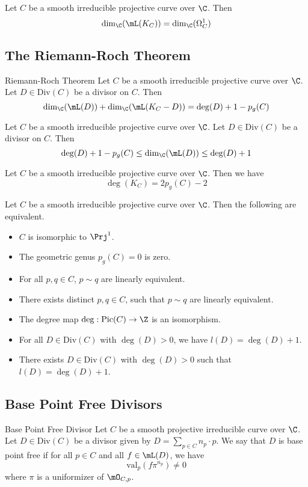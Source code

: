 \documentclass[a4paper]{article}
\begin{document}
\begin{lmm}{}{} Let $C$ be a smooth irreducible projective curve over $\C$. Then $$\dim_\C(\mL(K_C))=\dim_\C(\Omega_C^1)$$
\end{lmm}

\subsection{The Riemann-Roch Theorem}
\begin{thm}{Riemann-Roch Theorem}{} Let $C$ be a smooth irreducible projective curve over $\C$. Let $D\in\text{Div}(C)$ be a divisor on $C$. Then $$\dim_\C(\mL(D))+\dim_\C(\mL(K_C-D))=\deg(D)+1-p_g(C)$$
\end{thm}

\begin{prp}{}{} Let $C$ be a smooth irreducible projective curve over $\C$. Let $D\in\text{Div}(C)$ be a divisor on $C$. Then $$\deg(D)+1-p_g(C)\leq\dim_\C(\mL(D))\leq\deg(D)+1$$
\end{prp}

\begin{prp}{}{} Let $C$ be a smooth irreducible projective curve over $\C$. Then we have $$\deg(K_C)=2p_g(C)-2$$
\end{prp}

\begin{prp}{}{} Let $C$ be a smooth irreducible projective curve over $\C$. Then the following are equivalent. 
\begin{itemize}
\item $C$ is isomorphic to $\Prj^1$. 
\item The geometric genus $p_g(C)=0$ is zero. 
\item For all $p,q\in C$, $p\sim q$ are linearly equivalent. 
\item There exists distinct $p,q\in C$, such that $p\sim q$ are linearly equivalent. 
\item The degree map $\deg:\text{Pic}(C)\to\Z$ is an isomorphism. 
\item For all $D\in\text{Div}(C)$ with $\deg(D)>0$, we have $l(D)=\deg(D)+1$. 
\item There exists $D\in\text{Div}(C)$ with $\deg(D)>0$ such that $l(D)=\deg(D)+1$. 
\end{itemize}
\end{prp}

\subsection{Base Point Free Divisors}
\begin{defn}{Base Point Free Divisor}{} Let $C$ be a smooth projective irreducible curve over $\C$. Let $D\in\text{Div}(C)$ be a divisor given by $D=\sum_{p\in C}n_p\cdot p$. We say that $D$ is base point free if for all $p\in C$ and all $f\in\mL(D)$, we have $$\text{val}_p(f\pi^{n_p})\neq 0$$ where $\pi$ is a uniformizer of $\mO_{C,p}$. 
\end{defn}
\end{document}
